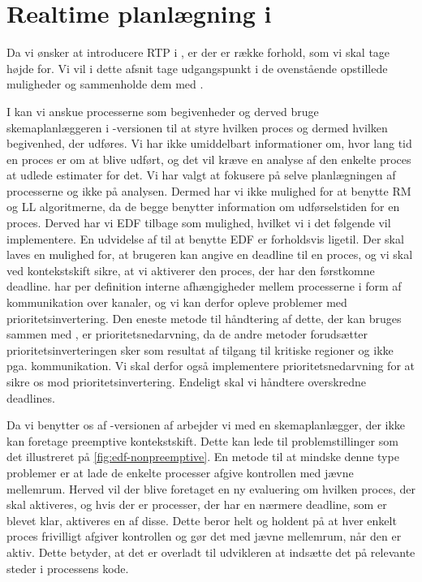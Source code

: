 \section{Realtime planlægning i \pycsp}
\label{sec:rtp-pycsp}
Da vi ønsker at introducere RTP i \pycsp, er der er række forhold, som vi skal tage højde for. Vi vil i dette afsnit tage udgangspunkt i de ovenstående opstillede muligheder og sammenholde dem med \pycsp. 

I \pycsp kan vi anskue processerne som begivenheder og derved bruge skemaplanlæggeren i -versionen til at styre hvilken proces og dermed hvilken begivenhed, der udføres. Vi har ikke umiddelbart informationer om, hvor lang tid en proces er om at blive udført, og det vil kræve en analyse af den enkelte proces at udlede estimater for det. Vi har valgt at fokusere på selve planlægningen af processerne og ikke på analysen. Dermed har vi ikke mulighed for at benytte RM og LL algoritmerne, da de begge benytter information om udførselstiden for en proces. Derved har vi EDF tilbage som mulighed, hvilket vi i det følgende vil implementere. En udvidelse af \pycsp til at benytte EDF er forholdsvis ligetil. Der skal laves en mulighed for, at brugeren kan angive en deadline til en proces, og vi skal ved kontekstskift sikre, at vi aktiverer den proces, der har den førstkomne deadline. \pycsp har per definition interne afhængigheder mellem processerne i form af kommunikation over kanaler, og vi kan derfor opleve problemer med prioritetsinvertering. Den eneste metode til håndtering af dette, der kan bruges sammen med \pycsp, er prioritetsnedarvning, da de andre metoder forudsætter prioritetsinverteringen  sker som resultat af tilgang til kritiske regioner og ikke pga. kommunikation. Vi skal derfor også implementere prioritetsnedarvning for at sikre os mod prioritetsinvertering. Endeligt skal vi håndtere overskredne deadlines.

Da vi benytter os af -versionen af \pycsp arbejder vi med en skemaplanlægger, der ikke kan foretage preemptive kontekstskift. Dette kan lede til problemstillinger som det illustreret på \cref{fig:edf-nonpreemptive}. En metode til at mindske denne type problemer er at lade de enkelte processer afgive kontrollen med jævne mellemrum. Herved vil der blive foretaget en ny evaluering om hvilken proces, der skal aktiveres, og hvis der er processer, der har en nærmere deadline, som er blevet klar, aktiveres en af disse. Dette beror helt og holdent på at hver enkelt proces frivilligt afgiver kontrollen og gør det med jævne mellemrum, når den er aktiv. Dette betyder, at det er overladt til udvikleren at indsætte det på relevante steder i processens kode. 

